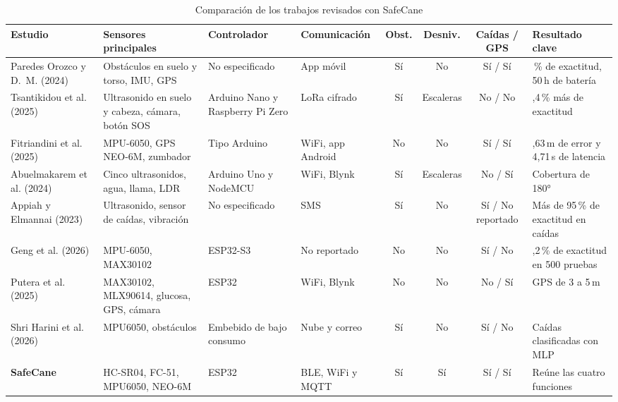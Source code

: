 \documentclass[conference,a4paper]{IEEEtran}
\begin{document}
\begin{table}[!t]
\caption{Comparación de los trabajos revisados con SafeCane}
\label{tab:comparacion}
\centering
\scriptsize
\renewcommand{\arraystretch}{1.2}
\setlength{\tabcolsep}{3.5pt}
\begin{tabular}{>{\raggedright\arraybackslash}p{2.6cm} >{\raggedright\arraybackslash}p{3.3cm} >{\raggedright\arraybackslash}p{2.2cm} >{\raggedright\arraybackslash}p{2.0cm} c c c >{\raggedright\arraybackslash}p{2.6cm}}
\toprule
\textbf{Estudio} & \textbf{Sensores principales} & \textbf{Controlador} & \textbf{Comunicación} & \textbf{Obst.} & \textbf{Desniv.} & \textbf{Caídas / GPS} & \textbf{Resultado clave} \\
\midrule
Paredes Orozco y D.\ M. \cite{paredes} (2024) & Obstáculos en suelo y torso, IMU, GPS & No especificado & App móvil & Sí & No & Sí / Sí & 98\,\% de exactitud, 50\,h de batería \\
Tsantikidou et al. \cite{tsantikidou} (2025) & Ultrasonido en suelo y cabeza, cámara, botón SOS & Arduino Nano y Raspberry Pi Zero & LoRa cifrado & Sí & Escaleras & No / No & 7,4\,\% más de exactitud \\
Fitriandini et al. \cite{fitriandini} (2025) & MPU-6050, GPS NEO-6M, zumbador & Tipo Arduino & WiFi, app Android & No & No & Sí / Sí & 4,63\,m de error y 4,71\,s de latencia \\
Abuelmakarem et al. \cite{abuelmakarem} (2024) & Cinco ultrasonidos, agua, llama, LDR & Arduino Uno y NodeMCU & WiFi, Blynk & Sí & Escaleras & No / Sí & Cobertura de 180° \\
Appiah y Elmannai \cite{appiah} (2023) & Ultrasonido, sensor de caídas, vibración & No especificado & SMS & Sí & No & Sí / No reportado & Más de 95\,\% de exactitud en caídas \\
Geng et al. \cite{geng} (2026) & MPU-6050, MAX30102 & ESP32-S3 & No reportado & No & No & Sí / No & 97,2\,\% de exactitud en 500 pruebas \\
Putera et al. \cite{putera} (2025) & MAX30102, MLX90614, glucosa, GPS, cámara & ESP32 & WiFi, Blynk & No & No & No / Sí & GPS de 3 a 5\,m \\
Shri Harini et al. \cite{shriharini} (2026) & MPU6050, obstáculos & Embebido de bajo consumo & Nube y correo & Sí & No & Sí / No & Caídas clasificadas con MLP \\
\midrule
\textbf{SafeCane} & HC-SR04, FC-51, MPU6050, NEO-6M & ESP32 & BLE, WiFi y MQTT & Sí & Sí & Sí / Sí & Reúne las cuatro funciones \\
\bottomrule
\end{tabular}
\end{table}
\end{document}
